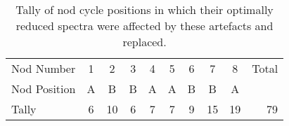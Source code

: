 \begin{table}
    \centering
    \caption{Tally of nod cycle positions in which their optimally reduced spectra were affected by these artefacts and replaced.}
    \begin{tabular}{lccccccccr}
        \toprule
        Nod Number & 1 & 2 & 3 & 4 & 5 & 6 & 7 & 8 &Total\\
        Nod Position & A & B & B & A & A & B & B & A & \\
        \midrule
        Tally & 6 & 10 & 6 & 7 & 7 & 9 & 15 & 19 & 79\\
        \bottomrule
    \end{tabular}\label{tab:nod_artefact_tally}
\end{table}